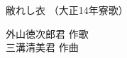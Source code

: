 \documentclass[10pt,b5j]{tarticle} %
\begin{document}
\begin{minipage}[c]{0.7\hsize} %
    \begin{center}
        {\LARGE
            敝れし衣 %
        }
        {\small 
            （大正14年寮歌） %
        }
    \end{center}
\end{minipage}
\begin{minipage}[c]{0.3\hsize} %
    \begin{flushright} %
        外山徳次郎君 作歌\\三溝清美君 作曲 %
    \end{flushright}
\end{minipage}
\end{document}

